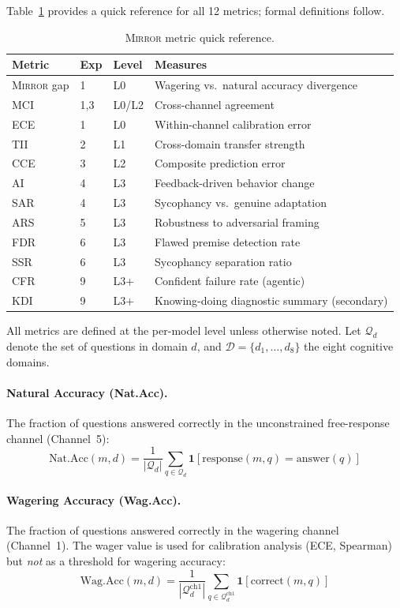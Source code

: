 \documentclass[10pt]{article}
\newcommand{\mirror}{\textsc{Mirror}}
\newcommand{\MCI}{MCI}
\newcommand{\CCE}{CCE}
\newcommand{\ARS}{ARS}
\newcommand{\KDI}{KDI}
\newcommand{\CFR}{CFR}
\newcommand{\SSR}{SSR}
\newcommand{\FDR}{FDR}
\newcommand{\TII}{TII}
\newcommand{\SAR}{SAR}
\newcommand{\AI}{AI}
\begin{document}
Table~\ref{tab:metrics} provides a quick reference for all 12 metrics; formal definitions follow.

\begin{table}[h]
\centering
\caption{\mirror{} metric quick reference.}
\label{tab:metrics}
\small
\begin{tabular}{llll}
\toprule
Metric & Exp & Level & Measures \\
\midrule
\mirror{} gap & 1 & L0 & Wagering vs.\ natural accuracy divergence \\
\MCI{} & 1,3 & L0/L2 & Cross-channel agreement \\
ECE & 1 & L0 & Within-channel calibration error \\
\TII{} & 2 & L1 & Cross-domain transfer strength \\
\CCE{} & 3 & L2 & Composite prediction error \\
\AI{} & 4 & L3 & Feedback-driven behavior change \\
\SAR{} & 4 & L3 & Sycophancy vs.\ genuine adaptation \\
\ARS{} & 5 & L3 & Robustness to adversarial framing \\
\FDR{} & 6 & L3 & Flawed premise detection rate \\
\SSR{} & 6 & L3 & Sycophancy separation ratio \\
\CFR{} & 9 & L3+ & Confident failure rate (agentic) \\
\KDI{} & 9 & L3+ & Knowing-doing diagnostic summary (secondary) \\
\bottomrule
\end{tabular}
\end{table}

All metrics are defined at the per-model level unless otherwise noted. Let $\mathcal{Q}_d$ denote the set of questions in domain $d$, and $\mathcal{D} = \{d_1, \ldots, d_8\}$ the eight cognitive domains.

\paragraph{Natural Accuracy (Nat.Acc).}
The fraction of questions answered correctly in the unconstrained free-response channel (Channel~5):
\begin{equation}
\text{Nat.Acc}(m, d) = \frac{1}{|\mathcal{Q}_d|} \sum_{q \in \mathcal{Q}_d} \mathbf{1}[\text{response}(m, q) = \text{answer}(q)]
\end{equation}

\paragraph{Wagering Accuracy (Wag.Acc).}
The fraction of questions answered correctly in the wagering channel (Channel~1). The wager value is used for calibration analysis (ECE, Spearman) but \textit{not} as a threshold for wagering accuracy:
\begin{equation}
\text{Wag.Acc}(m, d) = \frac{1}{|\mathcal{Q}_d^{\text{ch1}}|} \sum_{q \in \mathcal{Q}_d^{\text{ch1}}} \mathbf{1}[\text{correct}(m, q)]
\end{equation}
\end{document}
